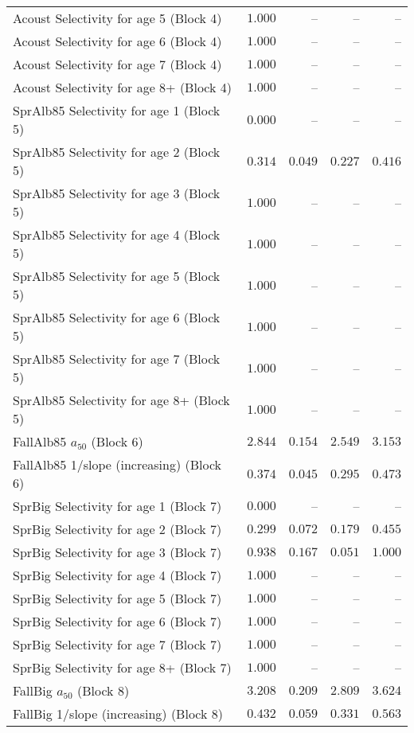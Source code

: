 \documentclass[
]{article}
\begin{document}
\begin{landscape}
\begin{longtable}[t]{lrrrr}
Acoust Selectivity for age 5 (Block 4) & $1.000$ & -- & -- & --\\
Acoust Selectivity for age 6 (Block 4) & $1.000$ & -- & -- & --\\
Acoust Selectivity for age 7 (Block 4) & $1.000$ & -- & -- & --\\
Acoust Selectivity for age 8+ (Block 4) & $1.000$ & -- & -- & --\\
\addlinespace
SprAlb85 Selectivity for age 1 (Block 5) & $0.000$ & -- & -- & --\\
SprAlb85 Selectivity for age 2 (Block 5) & $0.314$ & $0.049$ & $0.227$ & $0.416$\\
SprAlb85 Selectivity for age 3 (Block 5) & $1.000$ & -- & -- & --\\
SprAlb85 Selectivity for age 4 (Block 5) & $1.000$ & -- & -- & --\\
SprAlb85 Selectivity for age 5 (Block 5) & $1.000$ & -- & -- & --\\
\addlinespace
SprAlb85 Selectivity for age 6 (Block 5) & $1.000$ & -- & -- & --\\
SprAlb85 Selectivity for age 7 (Block 5) & $1.000$ & -- & -- & --\\
SprAlb85 Selectivity for age 8+ (Block 5) & $1.000$ & -- & -- & --\\
FallAlb85 $a_{50}$ (Block 6) & $2.844$ & $0.154$ & $2.549$ & $3.153$\\
FallAlb85 1/slope (increasing) (Block 6) & $0.374$ & $0.045$ & $0.295$ & $0.473$\\
\addlinespace
SprBig Selectivity for age 1 (Block 7) & $0.000$ & -- & -- & --\\
SprBig Selectivity for age 2 (Block 7) & $0.299$ & $0.072$ & $0.179$ & $0.455$\\
SprBig Selectivity for age 3 (Block 7) & $0.938$ & $0.167$ & $0.051$ & $1.000$\\
SprBig Selectivity for age 4 (Block 7) & $1.000$ & -- & -- & --\\
SprBig Selectivity for age 5 (Block 7) & $1.000$ & -- & -- & --\\
\addlinespace
SprBig Selectivity for age 6 (Block 7) & $1.000$ & -- & -- & --\\
SprBig Selectivity for age 7 (Block 7) & $1.000$ & -- & -- & --\\
SprBig Selectivity for age 8+ (Block 7) & $1.000$ & -- & -- & --\\
FallBig $a_{50}$ (Block 8) & $3.208$ & $0.209$ & $2.809$ & $3.624$\\
FallBig 1/slope (increasing) (Block 8) & $0.432$ & $0.059$ & $0.331$ & $0.563$\\

\end{longtable}
\end{landscape}
\end{document}

